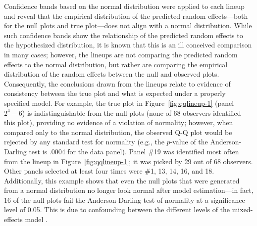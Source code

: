 \documentclass[12pt]{article} %
\newcommand{\hh}[1]{{\color{orange} #1}}
\newcommand{\al}[1]{{\color{ForestGreen} #1}}
\begin{document}
Confidence bands based on the normal distribution were applied to each lineup and reveal that the empirical distribution of the predicted random effects---both for the null plots and true plot---does not align with a normal distribution. While such confidence bands show the relationship of the predicted random effects to the hypothesized distribution, it is known that this is an ill conceived comparison in many cases; however, the lineups are not comparing the predicted random effects to the normal distribution, but rather are comparing the empirical distribution of the random effects between the null and observed plots. Consequently, the conclusions drawn from the lineups relate to evidence of consistency between the true plot and what is expected under a properly specified model. For example, the true plot in Figure~\ref{fig:qqlineup-1} (panel $2^4 - 6$) is indistinguishable from the null plots (none of 68 observers identified this plot), providing no evidence of a violation of normality; however, when compared only to the normal distribution, the observed Q-Q plot would %
be rejected by any standard test for normality (e.g., the $p$-value of the Anderson-Darling test is .0004 for the data panel).
Panel \#19 was identified  most often from the lineup in Figure~\ref{fig:qqlineup-1}; it was picked by 29 out of 68 observers. Other panels  selected at least four times were \#1, 13, 14, 16, and 18. 
Additionally, this example shows that even the null plots that were generated from a normal distribution no longer look normal after  model estimation---in fact, 16 of the null plots fail the Anderson-Darling test of normality at a significance level of 0.05. This is due to confounding between the different levels of the mixed-effects model  \citep{adam}.
\end{document}

